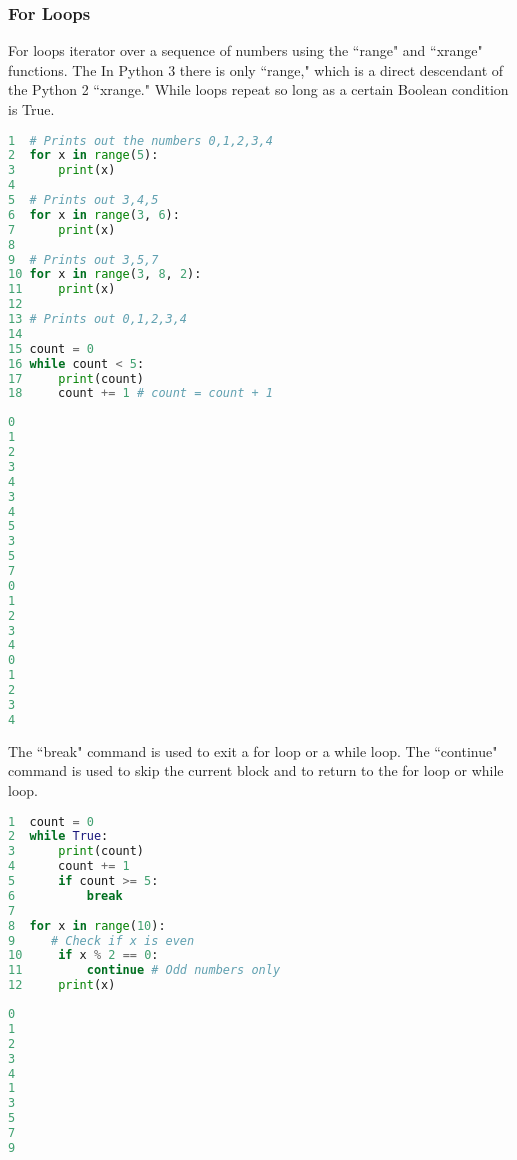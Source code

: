 \documentclass[crop=false,class=book]{standalone}
\begin{document}
\subsubsection{For Loops}
For loops iterator over a sequence of numbers using the ``range" and ``xrange" functions. The In Python 3 there is only ``range," which is a direct descendant of the Python 2 ``xrange." While loops repeat so long as a certain Boolean condition is True. \newline
\begin{minipage}[t]{.48\textwidth}
\centering
\begin{lstlisting}[language=python,frame=single,basicstyle=\footnotesize,frame=single,caption=input]
1  # Prints out the numbers 0,1,2,3,4
2  for x in range(5):
3      print(x)
4
5  # Prints out 3,4,5
6  for x in range(3, 6):
7      print(x)
8
9  # Prints out 3,5,7
10 for x in range(3, 8, 2):
11     print(x)
12
13 # Prints out 0,1,2,3,4
14
15 count = 0
16 while count < 5:
17     print(count)
18     count += 1 # count = count + 1
\end{lstlisting}
\end{minipage}\hfill
\begin{minipage}[t]{.48\textwidth}
\centering
\begin{lstlisting}[language=python,frame=single,basicstyle=\footnotesize,frame=single,caption=output]
0
1
2
3
4
3
4
5
3
5
7
0
1
2
3
4
0
1
2
3
4
\end{lstlisting}
\end{minipage}\newline
The ``break" command is used to exit a for loop or a while loop. The ``continue" command is used to skip the current block and to return to the for loop or while loop.\newline
\begin{minipage}[t]{.48\textwidth}
\centering
\begin{lstlisting}[language=python,frame=single,basicstyle=\footnotesize,frame=single,caption=input]
1  count = 0
2  while True:
3      print(count)
4      count += 1
5      if count >= 5:
6          break
7
8  for x in range(10):
9     # Check if x is even
10     if x % 2 == 0:
11         continue # Odd numbers only
12     print(x)
\end{lstlisting}
\end{minipage}\hfill
\begin{minipage}[t]{.48\textwidth}
\centering
\begin{lstlisting}[language=python,frame=single,basicstyle=\footnotesize,frame=single,caption=output]
0
1
2
3
4
1
3
5
7
9
\end{lstlisting}
\end{minipage}
\end{document}

